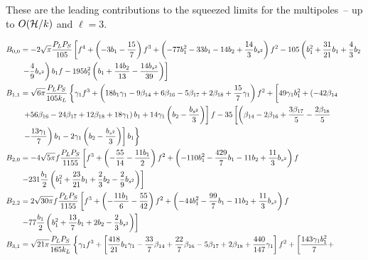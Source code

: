 These are the leading contributions to the squeezed limits for the multipoles~-- up to $O(\mathcal{H}/k)$ and \(\ell = 3\).

\begin{align}
%
B_{0,0} &=-2 \sqrt{\pi} \frac{P_LP_S}{105} \left[f^{4}+\left(-3 b_{1}-\frac{15}{7}\right) f^{3}+\left(-77 b_{1}^{2}-33 b_{1}-14 b_{2}+\frac{14}{3} b_{s^2}\right) f^{2}-105\left(b_{1}^{2}+\frac{31}{21} b_{1}+\frac{4}{3} b_{2}\right.\right.\nonumber\\
&\left.\left.-\frac{4}{9} b_{s^2}\right) b_{1} f-195 b_{1}^{2}\left(b_{1}+\frac{14 b_{2}}{13}-\frac{14 b_{s^2}}{39}\right)\right]\\
%
%
%
B_{1,1}&=\sqrt{6 \pi} \frac{P_L P_S}{105 k_{L}} \left\{ \gamma_1 f^{3}+\left(18 b_{1} \gamma_1-9 \beta_{14}+6 \beta_{16}-5 \beta_{17}+2 \beta_{18}+\frac{15}{7} \gamma_1\right) f^{2}+\left[ \vphantom{\frac{\gamma^2}{3}} 49 \gamma_1 b_{1}^{2}+\left(-42 \beta_{14}\right.\right.\right.\nonumber \\
&\left.\left. \left. +56 \beta_{16}-24 \beta_{17}+12 \beta_{18}+18 \gamma_1\right) b_{1}+14 \gamma_1\left(b_{2}-\frac{b_{s^2}}{3}\right)\right] f-35\left[\left(\beta_{14}-2 \beta_{16}+\frac{3 \beta_{17}}{5}-\frac{2 \beta_{18}}{5}\right.\right.\right.\nonumber
\\
&\left.\left.\left.-\frac{13 \gamma_1}{7}\right) b_{1}-2 \gamma_1\left(b_{2}-\frac{b_{s^2}}{3}\right)  \right] b_{1}\right\} \\
%
%
%
B_{2,0} &=- 4 \sqrt{5 \pi}  f \frac{P_L P_S}{1155} \left[f^{3}+\left(-\frac{55}{14}-\frac{11 b_{1}}{2}\right) f^{2}+\left(-110 b_{1}^{2}-\frac{429}{7} b_{1}-11 b_{2}+\frac{11}{3} b_{s^2}\right) f\right.\nonumber\\
&\left. - 231 \frac{b_1}{2} \left(b_{1}^{2}+\frac{23}{21} b_{1}+\frac{2}{3} b_{2}-\frac{2}{9} b_{s^2}\right)  \right]\\
%
%
%
B_{2,2} &= 2 \sqrt{30 \pi} f  \frac{P_L P_S}{1155} \left[f^{3}+\left(-\frac{11 b_{1}}{6}-\frac{55}{42}\right) f^{2}+\left(-44 b_{1}^{2}-\frac{99}{7} b_{1}-11 b_{2}+\frac{11}{3} b_{s^2}\right) f\right. \nonumber\\
& \left.- 77 \frac{b_1}{2} \left(b_{1}^{2}+\frac{13}{7} b_{1}+2 b_{2}-\frac{2}{3} b_{s^2}\right) \right] \\
%
%
B_{3,1}&=\sqrt{21 \pi }\frac{P_L P_S}{165 k_{L}}   \left\{  \gamma_1 f^{3} +\left[\frac{418}{21} b_{1} \gamma_1-\frac{33}{7} \beta_{14}+\frac{22}{7} \beta_{16}-5 \beta_{17}+2 \beta_{18}+\frac{440}{147} \gamma_1\right] f^{2} + \left[ \frac{143 \gamma_1 b_{1}^{2}}{7}+ \right.\right. \nonumber \\

\end{align}
